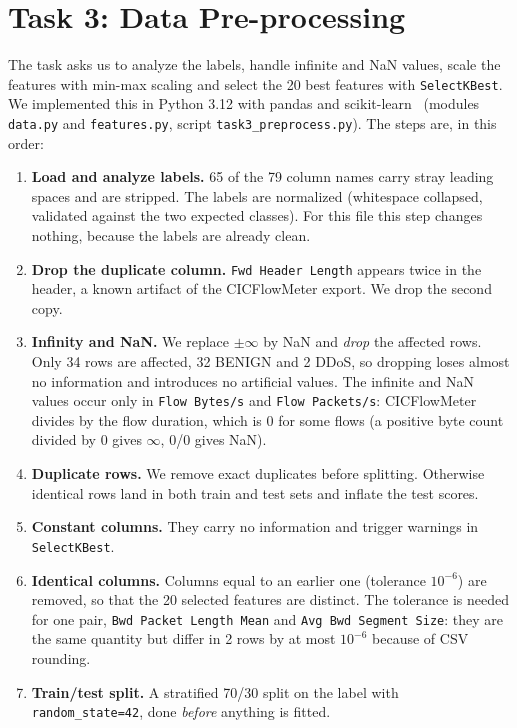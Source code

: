 \chapter{Task 3: Data Pre-processing}\label{chap:task3_preprocessing}

The task asks us to analyze the labels, handle infinite and NaN values, scale the features with min-max scaling and select the 20 best features with \texttt{SelectKBest}. We implemented this in Python 3.12 with pandas and scikit-learn~\cite{pedregosa2011sklearn} (modules \texttt{data.py} and \texttt{features.py}, script \texttt{task3\_preprocess.py}). The steps are, in this order:

\begin{enumerate}\setlength\itemsep{0pt}
	\item \textbf{Load and analyze labels.} 65 of the 79 column names carry stray leading spaces and are stripped. The labels are normalized (whitespace collapsed, validated against the two expected classes). For this file this step changes nothing, because the labels are already clean.
	\item \textbf{Drop the duplicate column.} \texttt{Fwd Header Length} appears twice in the header, a known artifact of the CICFlowMeter export. We drop the second copy.
	\item \textbf{Infinity and NaN.} We replace $\pm\infty$ by NaN and \emph{drop} the affected rows. Only 34 rows are affected, 32 BENIGN and 2 DDoS, so dropping loses almost no information and introduces no artificial values. The infinite and NaN values occur only in \texttt{Flow Bytes/s} and \texttt{Flow Packets/s}: CICFlowMeter divides by the flow duration, which is 0 for some flows (a positive byte count divided by 0 gives $\infty$, 0/0 gives NaN).
	\item \textbf{Duplicate rows.} We remove exact duplicates before splitting. Otherwise identical rows land in both train and test sets and inflate the test scores.
	\item \textbf{Constant columns.} They carry no information and trigger warnings in \texttt{SelectKBest}.
	\item \textbf{Identical columns.} Columns equal to an earlier one (tolerance $10^{-6}$) are removed, so that the 20 selected features are distinct. The tolerance is needed for one pair, \texttt{Bwd Packet Length Mean} and \texttt{Avg Bwd Segment Size}: they are the same quantity but differ in 2 rows by at most $10^{-6}$ because of CSV rounding.
	\item \textbf{Train/test split.} A stratified 70/30 split on the label with \texttt{random\_state=42}, done \emph{before} anything is fitted.

\end{enumerate}
